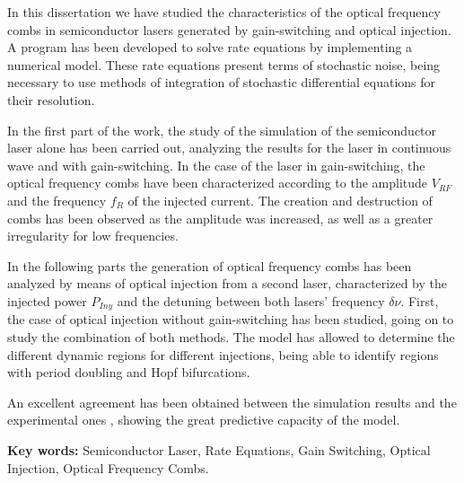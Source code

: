 \documentclass[a4paper, 11pt, oneside]{book}
\begin{document}
				In this dissertation we have studied the characteristics of the optical frequency combs in semiconductor lasers generated by gain-switching and optical injection. A program has been developed to solve rate equations by implementing a numerical model. These rate equations present terms of stochastic noise, being necessary to use methods of integration of stochastic differential equations for their resolution. 
				
				In the first part of the work, the study of the simulation of the semiconductor laser alone has been carried out, analyzing the results for the laser in continuous wave and with gain-switching. In the case of the laser in gain-switching, the optical frequency combs have been characterized according to the amplitude $V_{RF}$ and the frequency $f_R$ of the injected current. The creation and destruction of combs has been observed as the amplitude was increased, as well as a greater irregularity for low frequencies.

				In the following parts the generation of optical frequency combs has been analyzed by means of optical injection from a second laser, characterized by the injected power $P_{Iny}$ and the detuning between both lasers' frequency $\delta\nu$. First, the case of optical injection without gain-switching has been studied, going on to study the combination of both methods. The model has allowed to determine the different dynamic regions for different injections, being able to identify regions with period doubling and Hopf bifurcations.

				An excellent agreement has been obtained between the simulation results and the experimental ones \cite{Chaves19}, showing the great predictive capacity of the model.

			\begin{center}
				\textbf{Key words:} Semiconductor Laser, Rate Equations, Gain Switching, Optical Injection, Optical Frequency Combs. 
			\end{center}


		\tableofcontents



\end{document}
